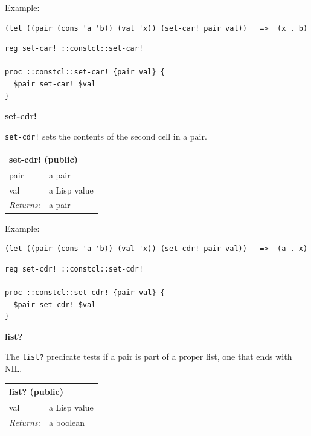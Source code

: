 \documentclass[twoside,9pt]{report}
\begin{document}
Example:

\noindent\makebox[\linewidth]{\rule{\linewidth}{0.4pt}}
\begin{lstlisting}
(let ((pair (cons 'a 'b)) (val 'x)) (set-car! pair val))   =>  (x . b)
\end{lstlisting}
\noindent\makebox[\linewidth]{\rule{\linewidth}{0.4pt}}
\noindent\makebox[\linewidth]{\rule{\linewidth}{0.4pt}}
\begin{lstlisting}
reg set-car! ::constcl::set-car!
 
proc ::constcl::set-car! {pair val} {
  $pair set-car! $val
}
\end{lstlisting}
\noindent\makebox[\linewidth]{\rule{\linewidth}{0.4pt}}

\textbf{set-cdr!}


\texttt{set-cdr!} sets the contents of the second cell in a pair.

\begin{tabular}{ |l l| }
\hline
\multicolumn{2}{|l|}{set-cdr! (public)} \\
\hline
pair & a pair \\
val & a Lisp value \\
\textit{Returns:} & a pair \\
\hline
\end{tabular}


Example:

\noindent\makebox[\linewidth]{\rule{\linewidth}{0.4pt}}
\begin{lstlisting}
(let ((pair (cons 'a 'b)) (val 'x)) (set-cdr! pair val))   =>  (a . x)
\end{lstlisting}
\noindent\makebox[\linewidth]{\rule{\linewidth}{0.4pt}}
\noindent\makebox[\linewidth]{\rule{\linewidth}{0.4pt}}
\begin{lstlisting}
reg set-cdr! ::constcl::set-cdr!
 
proc ::constcl::set-cdr! {pair val} {
  $pair set-cdr! $val
}
\end{lstlisting}
\noindent\makebox[\linewidth]{\rule{\linewidth}{0.4pt}}

\textbf{list?}


The \texttt{list?} predicate tests if a pair is part of a proper list, one that ends with NIL.

\begin{tabular}{ |l l| }
\hline
\multicolumn{2}{|l|}{list? (public)} \\
\hline
val & a Lisp value \\
\textit{Returns:} & a boolean \\
\hline
\end{tabular}
\end{document}
